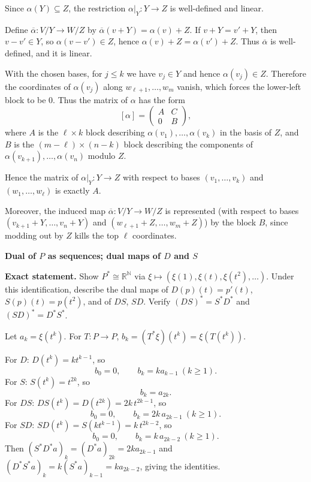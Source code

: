 \begin{solution}
Since $\alpha(Y)\subseteq Z$, the restriction $\alpha|_Y:Y\to Z$ is well-defined and linear.

Define $\overline{\alpha}:V/Y\to W/Z$ by $\overline{\alpha}(v+Y)=\alpha(v)+Z$.
If $v+Y=v'+Y$, then $v-v'\in Y$, so $\alpha(v-v')\in Z$, hence $\alpha(v)+Z=\alpha(v')+Z$.
Thus $\overline{\alpha}$ is well-defined, and it is linear.

With the chosen bases, for $j\le k$ we have $v_j\in Y$ and hence $\alpha(v_j)\in Z$.
Therefore the coordinates of $\alpha(v_j)$ along $w_{\ell+1},\dots,w_m$ vanish, which forces the lower-left block to be $0$.
Thus the matrix of $\alpha$ has the form
\[
[\alpha]=\begin{pmatrix}
	A & C\\
	0 & B
\end{pmatrix},
\]
where $A$ is the $\ell\times k$ block describing $\alpha(v_1),\dots,\alpha(v_k)$ in the basis of $Z$,
and $B$ is the $(m-\ell)\times(n-k)$ block describing the components of $\alpha(v_{k+1}),\dots,\alpha(v_n)$
modulo $Z$.

Hence the matrix of $\alpha|_Y:Y\to Z$ with respect to bases $(v_1,\dots,v_k)$ and $(w_1,\dots,w_\ell)$ is exactly $A$.

Moreover, the induced map $\overline{\alpha}:V/Y\to W/Z$ is represented (with respect to bases
$(v_{k+1}+Y,\dots,v_n+Y)$ and $(w_{\ell+1}+Z,\dots,w_m+Z)$) by the block $B$, since modding out by $Z$
kills the top $\ell$ coordinates.

\bigskip
\end{solution}

\begin{problem}[CP-I-0069]
\label{prob:cp-i-0069}
\textbf{Dual of \(P\) as sequences; dual maps of \(D\) and \(S\)}

\textbf{Exact statement.}
\hspace*{1.5em}Show \(P^*\cong\mathbb R^{\mathbb N}\) via \(\xi\mapsto (\xi(1),\xi(t),\xi(t^2),\dots)\).
Under this identification, describe the dual maps of
\(D(p)(t)=p'(t)\), \(S(p)(t)=p(t^2)\), and of \(DS\), \(SD\).
Verify \((DS)^*=S^*D^*\) and \((SD)^*=D^*S^*\).

\end{problem}

\begin{solution}
Let \(a_k=\xi(t^k)\). For \(T:P\to P\), \(b_k=(T^*\xi)(t^k)=\xi(T(t^k))\).

For \(D\): \(D(t^k)=k t^{k-1}\), so
\[
b_0=0,\qquad b_k=k a_{k-1}\ (k\ge1).
\]
For \(S\): \(S(t^k)=t^{2k}\), so
\[
b_k=a_{2k}.
\]
For \(DS\): \(DS(t^k)=D(t^{2k})=2k\,t^{2k-1}\), so
\[
b_0=0,\qquad b_k=2k\,a_{2k-1}\ (k\ge1).
\]
For \(SD\): \(SD(t^k)=S(k t^{k-1})=k\,t^{2k-2}\), so
\[
b_0=0,\qquad b_k=k\,a_{2k-2}\ (k\ge1).
\]
Then \((S^*D^*a)_k=(D^*a)_{2k}=2k a_{2k-1}\) and \((D^*S^*a)_k=k(S^*a)_{k-1}=k a_{2k-2}\), giving the identities.
\end{solution}

